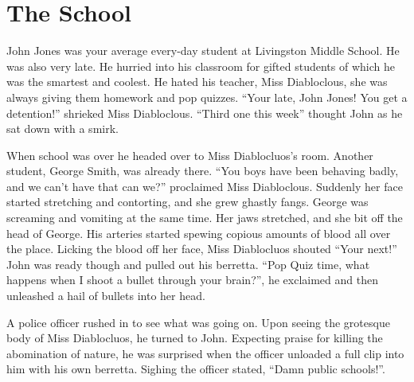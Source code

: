 \chapter{The School}


John Jones was your average every-day student at Livingston Middle
School. He was also very late. He hurried into his classroom for
gifted students of which he was the smartest and coolest. He
hated his teacher, Miss Diabloclous, she was always giving them
homework and pop quizzes. ``Your late, John Jones! You get a
detention!'' shrieked Miss Diabloclous. ``Third one this
week'' thought John as he sat down with a smirk.



When school was over he headed over to Miss Diablocluos's
room. Another student, George Smith, was already there. ``You
boys have been behaving badly, and we can't have that can
we?'' proclaimed Miss Diabloclous. Suddenly her face started
stretching and contorting, and she grew ghastly fangs. George was
screaming and vomiting at the same time. Her jaws stretched, and
she bit off the head of George. His arteries started spewing
copious amounts of blood all over the place. Licking the blood off
her face, Miss Diablocluos shouted ``Your next!'' John
was ready though and pulled out his berretta. ``Pop Quiz time,
what happens when I shoot a bullet through your brain?'', he
exclaimed and then unleashed a hail of bullets into her head.



A police officer rushed in to see what was going on. Upon seeing
the grotesque body of Miss Diablocluos, he turned to John.
Expecting praise for killing the abomination of nature, he was
surprised when the officer unloaded a full clip into him with his
own berretta. Sighing the officer stated, ``Damn public
schools!''. 
 



